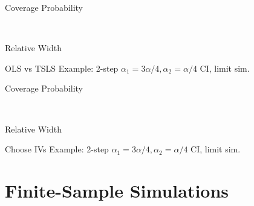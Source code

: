 \documentclass[12pt,letterpaper]{article}
\begin{document}
\begin{table}[h]
  \centering
  \begin{subtable}{0.48\textwidth}
    \caption{Coverage Probability}
    
  \end{subtable}
  ~
  \begin{subtable}{0.48\textwidth}
    \caption{Relative Width}
    
  \end{subtable}
  \label{tab:Limit2StepNarrowTauOLSvsIV}
  \caption{OLS vs TSLS Example: 2-step $\alpha_1 = 3\alpha/4,  \alpha_2 = \alpha/4$ CI, limit sim.}
\end{table}

\begin{table}[h]
  \centering
  \begin{subtable}{0.48\textwidth}
    \caption{Coverage Probability}
    
  \end{subtable}
  ~
  \begin{subtable}{0.48\textwidth}
    \caption{Relative Width}
    
  \end{subtable}
  \label{tab:Limit2StepNarrowTauChooseIVs}
  \caption{Choose IVs Example: 2-step $\alpha_1 = 3\alpha/4,  \alpha_2 = \alpha/4$ CI, limit sim.}
\end{table}

\section{Finite-Sample Simulations}
\end{document}
